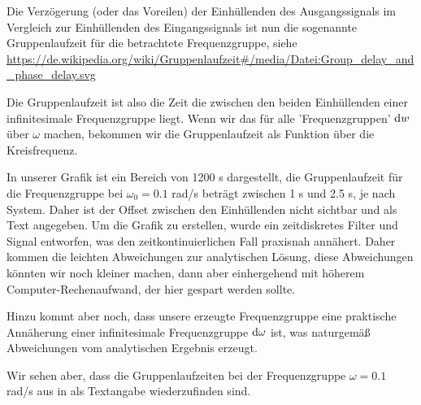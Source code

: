 \begin{Loesung}
Die Verzögerung (oder das Voreilen)
der Einhüllenden des Ausgangssignals im Vergleich zur Einhüllenden des
Eingangssignals ist nun die sogenannte Gruppenlaufzeit für die betrachtete
Frequenzgruppe, siehe
\url{https://de.wikipedia.org/wiki/Gruppenlaufzeit#/media/Datei:Group_delay_and_phase_delay.svg}

Die Gruppenlaufzeit ist also die Zeit die zwischen den beiden Einhüllenden
einer infinitesimale Frequenzgruppe liegt. Wenn wir das für alle 'Frequenzgruppen'
$\mathrm{d} w$ über $\omega$ machen, bekommen wir die Gruppenlaufzeit als Funktion
über die Kreisfrequenz.

In unserer Grafik ist ein Bereich von 1200 s dargestellt, die Gruppenlaufzeit
für die Frequenzgruppe bei $\omega_0=0.1$ rad/s beträgt zwischen 1 s und 2.5 s, je
nach System. Daher ist der Offset zwischen den Einhüllenden nicht sichtbar
und als Text angegeben.
Um die Grafik zu erstellen, wurde ein zeitdiskretes Filter und Signal entworfen,
was den zeitkontinuierlichen Fall praxisnah annähert. Daher kommen die
leichten Abweichungen zur analytischen Lösung, diese Abweichungen könnten wir
noch kleiner machen, dann aber einhergehend mit höherem Computer-Rechenaufwand,
der hier gespart werden sollte.

Hinzu kommt aber noch, dass unsere erzeugte Frequenzgruppe eine praktische
Annäherung einer infinitesimale Frequenzgruppe $\mathrm{d} \omega$ ist, was naturgemäß
Abweichungen vom analytischen Ergebnis erzeugt.

Wir sehen aber, dass die Gruppenlaufzeiten bei der Frequenzgruppe
$\omega=0.1$ rad/s aus  in
 als Textangabe wiederzufinden sind.
\end{Loesung}


